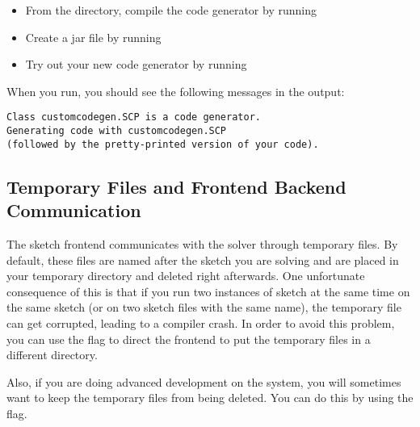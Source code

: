 \begin{itemize}
\item From the  directory, compile the code generator by running \newline
 \version{}
\item Create a jar file by running \newline
{}
\item Try out your new code generator by running \newline
{}
\end{itemize}

When you run, you should see the following messages in the output:
\begin{lstlisting}
Class customcodegen.SCP is a code generator.
Generating code with customcodegen.SCP
(followed by the pretty-printed version of your code).
\end{lstlisting}



\subsection{Temporary Files and Frontend Backend Communication}

The sketch frontend communicates with the solver through temporary files.
By default, these files are named after the sketch you are solving and
are placed in your temporary directory and deleted right afterwards. One
unfortunate consequence of this is that if you run two instances of sketch at the same
time on the same sketch (or on two sketch files with the same name), the temporary file
can get corrupted, leading to a compiler crash. In order to avoid this problem, you can use the flag
 to direct the frontend to put the temporary files in a different directory.


Also, if you are doing advanced development on the system, you will sometimes want to keep
the temporary files from being deleted. You can do this by using the  flag.


